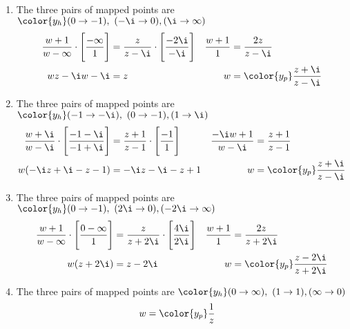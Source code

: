 \begin{enumerate}
    \item The three pairs of mapped points are
          $\color{y_h}  (0 \to -1),\ (-\i \to 0), (\i \to \infty) $
          \begin{align}
              \frac{w + 1}{w - \infty} \cdot \Bigg[\frac{-\infty}{1}\Bigg]
                              & = \frac{z}{z - \i} \cdot
              \Bigg[ \frac{-2\i}{-\i}
              \Bigg]          &
              \frac{w + 1}{1} & = \frac{2z}{z - \i}                   \\
              wz - \i w - \i  & = z                                 &
              w               & = \color{y_p} \frac{z + \i}{z - \i}
          \end{align}

    \item The three pairs of mapped points are
          $\color{y_h}  (-1 \to -\i),\ (0 \to -1), (1 \to \i) $
          \begin{align}
              \frac{w + \i}{w - \i} \cdot \Bigg[\frac{-1 - \i}{-1 + \i}\Bigg]
                                       & = \frac{z + 1}{z - 1} \cdot
              \Bigg[ \frac{-1}{1}
              \Bigg]                   &
              \frac{-\i w + 1}{w - \i} & = \frac{z + 1}{z - 1}         \\
              w(-\i z + \i  - z - 1)   & =  -\i z - \i - z  + 1      &
              w                        & = \color{y_p} \frac{z + \i}
              {z - \i}
          \end{align}

    \item The three pairs of mapped points are
          $\color{y_h}  (0 \to -1),\ (2\i \to 0), (-2\i \to \infty) $
          \begin{align}
              \frac{w + 1}{w - \infty} \cdot \Bigg[\frac{0 - \infty}{1}\Bigg]
                              & = \frac{z}{z + 2\i} \cdot
              \Bigg[ \frac{4\i}{2\i}
              \Bigg]          &
              \frac{w + 1}{1} & = \frac{2z}{z + 2\i}                    \\
              w(z + 2\i)      & =  z - 2\i                            &
              w               & = \color{y_p} \frac{z - 2\i}{z + 2\i}
          \end{align}

    \item The three pairs of mapped points are
          $\color{y_h}  (0 \to \infty),\ (1 \to 1), (\infty \to 0) $
          \begin{align}
              w & = \color{y_p} \frac{1}{z}
          \end{align}


\end{enumerate}
